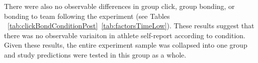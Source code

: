 \documentclass[english]{article}\usepackage[]{graphicx}\usepackage[]{color}
\begin{document}







There were also no observable differences in group click, group bonding, or bonding to team following the experiment (see Tables ~\ref{tab:clickBondConditionPost}\nobreakdash~\ref{tab:factorsTimeLow}).  These results suggest that there was no observable variaiton in athlete self-report according to condition.  Given these results, the entire experiment sample was collapsed into one group and study predictions were tested in this group as a whole.
\end{document}
